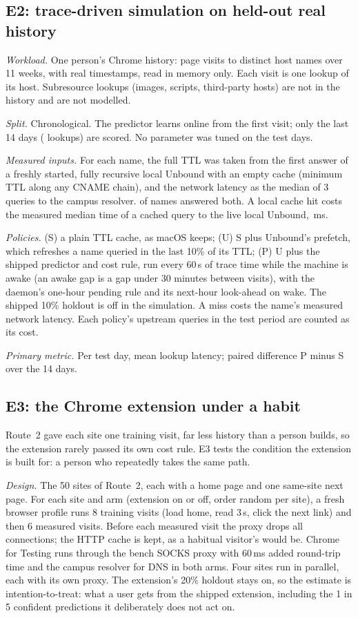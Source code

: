 \subsection{E2: trace-driven simulation on held-out real history}
\emph{Workload.} One person's Chrome history:  page visits to  distinct host names over 11 weeks, with real timestamps, read in memory only. Each visit is one lookup of its host. Subresource lookups (images, scripts, third-party hosts) are not in the history and are not modelled.

\emph{Split.} Chronological. The predictor learns online from the first visit; only the last 14 days ( lookups) are scored. No parameter was tuned on the test days.

\emph{Measured inputs.} For each name, the full TTL was taken from the first answer of a freshly started, fully recursive local Unbound with an empty cache (minimum TTL along any CNAME chain), and the network latency as the median of 3 queries to the campus resolver.  of  names answered both. A local cache hit costs the measured median time of a cached query to the live local Unbound, \,ms.

\emph{Policies.} (S) a plain TTL cache, as macOS keeps; (U) S plus Unbound's prefetch, which refreshes a name queried in the last 10\% of its TTL; (P) U plus the shipped predictor and cost rule, run every 60\,s of trace time while the machine is awake (an awake gap is a gap under 30 minutes between visits), with the daemon's one-hour pending rule and its next-hour look-ahead on wake. The shipped 10\% holdout is off in the simulation. A miss costs the name's measured network latency. Each policy's upstream queries in the test period are counted as its cost.

\emph{Primary metric.} Per test day, mean lookup latency; paired difference P minus S over the 14 days.

\subsection{E3: the Chrome extension under a habit}
Route~2 gave each site one training visit, far less history than a person builds, so the extension rarely passed its own cost rule. E3 tests the condition the extension is built for: a person who repeatedly takes the same path.

\emph{Design.} The 50 sites of Route~2, each with a home page and one same-site next page. For each site and arm (extension on or off, order random per site), a fresh browser profile runs 8 training visits (load home, read 3\,s, click the next link) and then 6 measured visits. Before each measured visit the proxy drops all connections; the HTTP cache is kept, as a habitual visitor's would be. Chrome for Testing runs through the bench SOCKS proxy with 60\,ms added round-trip time and the campus resolver for DNS in both arms. Four sites run in parallel, each with its own proxy. The extension's 20\% holdout stays on, so the estimate is intention-to-treat: what a user gets from the shipped extension, including the 1 in 5 confident predictions it deliberately does not act on.

